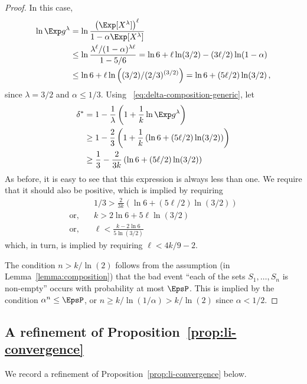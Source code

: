 \begin{proof}
In this case, 
\begin{align*}
    \ln \Exp g^\lambda 
    &= \ln \frac{\left(\Exp[X^\lambda] \right)^\ell}{1 - \alpha \Exp[X^\lambda]} \\
    &\leq \ln \frac{\lambda^\ell/(1 - \alpha)^{\lambda \ell}}{1 - 5/6}
    = \ln 6 + \ell \ln(3/2) - (3 \ell/2) \ln(1-\alpha) \\
    &\leq \ln 6 +  \ell \ln \left( (3/2)/(2/3)^{(3/2)} \right)
    = \ln 6 + (5\ell/2) \ln(3/2)
    \,,
\end{align*}
since $\lambda = 3/2$ and $\alpha \leq 1/3$.
Using ~\eqref{eq:delta-composition-generic}, let
\begin{align*}
    \delta^*
    &= 1 - \frac{1}{\lambda}\left(1 + \frac{1}{k} \ln \Exp g^\lambda \right) \\
    &\geq 1 - \frac{2}{3}\left(1 + \frac{1}{k} \left(\ln 6 + (5\ell/2) \ln(3/2) \right) \right) \\
    &\geq \frac{1}{3} - \frac{2}{3k} \left( \ln 6 + (5\ell/2)\ln(3/2) \right)
\end{align*}
As before, it is easy to see that this expression is always less than one. 
We require that it should also be positive, which is implied by requiring
\begin{align*}
    &1/3 >\frac{2}{3k} \left( \ln 6 + (5\ell/2)\ln(3/2) \right) \\
    \text{or,}\quad& k > 2\ln 6 + 5\ell\ln(3/2) \\
    \text{or,}\quad& \ell < \frac{k - 2\ln 6}{ 5\ln(3/2)}\,
\end{align*}
which, in turn, is implied by requiring $\ell < 4k/9 - 2$.

The condition $n > k/\ln(2)$ follows from the assumption (in Lemma~\ref{lemma:composition}) that 
the bad event ``each of the sets $S_1, \ldots, S_{n}$ is non-empty''
occurs with probability at most $\EpsP$. 
This is implied by the condition $\alpha^n \leq \EpsP$, or $n \geq k/\ln(1/\alpha) > k/\ln(2)$ since $\alpha < 1/2$. 
\end{proof}



\subsection{A refinement of Proposition~\ref{prop:li-convergence}}

We record a refinement of Proposition~\ref{prop:li-convergence} below.

